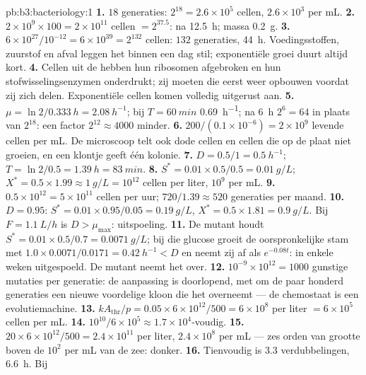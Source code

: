 \begin{solution}{pb:b3:bacteriology:1}
\textbf{1.} $18$ generaties: $2^{18} = 2.6\times 10^{5}$ cellen,
$2.6\times 10^{3}$ per mL.
\textbf{2.} $2\times 10^{9}\times 100 = 2\times 10^{11}$ cellen $=
2^{37.5}$: na \qty{12.5}{h}; massa \qty{0.2}{g}.
\textbf{3.} $6\times 10^{27}/10^{-12} = 6\times 10^{39} = 2^{132}$
cellen: $132$ generaties, \qty{44}{h}. Voedingsstoffen, zuurstof en
afval leggen het binnen een dag stil; exponentiële groei duurt altijd
kort.
\textbf{4.} Cellen uit de  hebben hun ribosomen
afgebroken en hun stofwisselingsenzymen onderdrukt; zij moeten die
eerst weer opbouwen voordat zij zich delen. Exponentiële cellen komen
volledig uitgerust aan.
\textbf{5.} $\mu = \ln 2/\qty{0.333}{h} = \qty{2.08}{h^{-1}}$; bij $T =
\qty{60}{min}$ \qty{0.69}{h^{-1}}; na \qty{6}{h} $2^{6} = 64$ in plaats
van $2^{18}$: een factor $2^{12} \approx 4000$ minder.
\textbf{6.} $200/(0.1\times 10^{-6}) = 2\times 10^{9}$ levende cellen
per mL. De microscoop telt ook dode cellen en cellen die op de plaat
niet groeien, en een klontje geeft één kolonie.
\textbf{7.} $D = 0.5/1 = \qty{0.5}{h^{-1}}$; $T = \ln 2/0.5 =
\qty{1.39}{h} = \qty{83}{min}$.
\textbf{8.} $S^{*} = 0.01\times 0.5/0.5 = \qty{0.01}{g/L}$; $X^{*} =
0.5\times 1.99 \approx \qty{1}{g/L} = 10^{12}$ cellen per liter, $10^{9}$
per mL.
\textbf{9.} $0.5\times 10^{12} = 5\times 10^{11}$ cellen per uur; $720/1.39
\approx 520$ generaties per maand.
\textbf{10.} $D = 0.95$: $S^{*} = 0.01\times 0.95/0.05 = \qty{0.19}{g/L}$,
$X^{*} = 0.5\times 1.81 = \qty{0.9}{g/L}$. Bij $F = \qty{1.1}{L/h}$ is $D
> \mu_{\max}$: uitspoeling.
\textbf{11.} De mutant houdt $S^{*} = 0.01\times 0.5/0.7 = \qty{0.0071}{g/L}$;
bij die glucose groeit de oorspronkelijke stam met $1.0\times 0.0071/0.0171 =
\qty{0.42}{h^{-1}} < D$ en neemt zij af als $e^{-0.08t}$: in enkele
weken uitgespoeld. De mutant neemt het over.
\textbf{12.} $10^{-9}\times 10^{12} = 1000$ gunstige mutaties per
generatie: de aanpassing is doorlopend, met om de paar honderd
generaties een nieuwe voordelige kloon die het overneemt --- de
chemostaat is een evolutiemachine.
\textbf{13.} $kA_{\text{thr}}/p = 0.05\times 6\times 10^{12}/500 =
6\times 10^{8}$ per liter $= 6\times 10^{5}$ cellen per mL.
\textbf{14.} $10^{10}/6\times 10^{5} \approx 1.7\times 10^{4}$-voudig.
\textbf{15.} $20\times 6\times 10^{12}/500 = 2.4\times 10^{11}$ per liter,
$2.4\times 10^{8}$ per mL --- zes orden van grootte boven de $10^{2}$
per mL van de zee: donker.
\textbf{16.} Tienvoudig is $3.3$ verdubbelingen, \qty{6.6}{h}. Bij

\end{solution}

